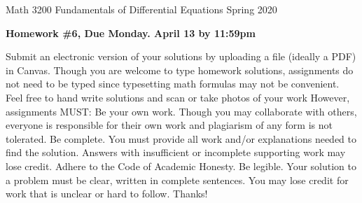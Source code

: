 \clearpage


Math 3200 \hfill Fundamentals of Differential Equations \hfill Spring 2020

\bigskip

\begin{center}{\large \textbf{Homework \#6, Due Monday. April 13 by 11:59pm}} \end{center}

\bigskip



\bi
\ii Submit an electronic version of your solutions by uploading a file (ideally a PDF) in Canvas. 
\ii Though you are welcome to type homework solutions, assignments do not need to be typed since typesetting math formulas may not be convenient.  Feel free to hand write solutions and scan or take photos of your work  However, assignments MUST:
\bi
\ii Be your own work. Though you may collaborate with others, everyone is responsible for their own work and plagiarism of any form is not tolerated.
\ii Be complete. You must provide all work and/or explanations needed to find the solution. Answers with insufficient or incomplete supporting work may lose credit.
\ii Adhere to the Code of Academic Honesty.
\ii Be legible. Your solution to a problem must be clear, written in complete sentences. You may lose credit for work that is unclear or hard to follow.
\ei
\ii Thanks!
\ei


